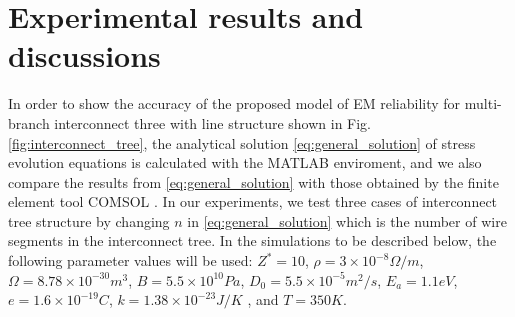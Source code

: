 \section{Experimental results and discussions}
\label{sec:experimental_results}
In order to show the accuracy of the proposed model of EM reliability for multi-branch interconnect three with line structure shown in Fig. \ref{fig:interconnect_tree}, the analytical solution \eqref{eq:general_solution} of stress evolution equations is calculated with the MATLAB enviroment, and we also compare the results from \eqref{eq:general_solution} with those obtained by the finite element tool COMSOL \cite{COMSOL}. In our experiments, we test three cases of interconnect tree structure by changing $n$ in \eqref{eq:general_solution} which is the number of wire segments in the interconnect tree. In the simulations to be described below, the following parameter values will be used: $Z^*=10$, $\rho=3\times10^{-8} \Omega/m$, $\Omega=8.78\times10^{-30}m^3$, $B=5.5\times10^{10} Pa$, $D_0=5.5\times10^{-5} m^2/s$, $E_a=1.1eV$, $e=1.6\times10^{-19}C$, $k=1.38\times10^{-23}J/K$ , and $T=350K$.

